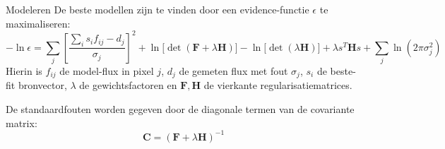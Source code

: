 \documentclass[aspectratio=169,xcolor=dvipsnames]{beamer}
\begin{document}
\begin{frame}{Modeleren}
    De beste modellen zijn te vinden door een evidence-functie \(\epsilon\) te maximaliseren:
    \[ 
    -\ln \epsilon = \sum_j \left[\frac{\sum_i s_i f_{ij} - d_j}{\sigma_j}\right]^2
    + \ln\!\bigl[\det(\bm F + \lambda  \bm H)\bigr]
    - \ln\!\bigl[\det(\lambda \bm H)\bigr]
    + \lambda s^{T} \bm H s
    + \sum_j \ln\!\left(2\pi \sigma_j^2\right)
    \]
    Hierin is $f_{ij}$ de model-flux in pixel $j$, $d_j$ de gemeten flux met fout $\sigma_j$, $s_i$ de beste-fit bronvector, $\lambda$ de gewichtsfactoren en $\mathbf{F}, \mathbf{H}$ de vierkante regularisatiematrices.

    \vspace{0.2cm}
    De standaardfouten worden gegeven door de diagonale termen van de covariante matrix:
    \[
    \bm C = (\bm F + \lambda \bm H)^{-1}
    \]
    
\end{frame}
\end{document}
